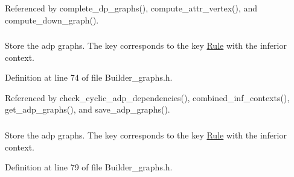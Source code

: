 Referenced by complete\_\-dp\_\-graphs(), compute\_\-attr\_\-vertex(), and compute\_\-down\_\-graph().

\hypertarget{classgenevalmag_1_1Builder__graphs_a75e37bb5a6f499fdd57f97061e313ec5}{
\subsubsection[{p\_\-Adp\_\-graphs}]{}}
\label{classgenevalmag_1_1Builder__graphs_a75e37bb5a6f499fdd57f97061e313ec5}


Store the adp graphs. The key corresponds to the key \hyperlink{classgenevalmag_1_1Rule}{Rule} with the inferior context. 



Definition at line 74 of file Builder\_\-graphs.h.



Referenced by check\_\-cyclic\_\-adp\_\-dependencies(), combined\_\-inf\_\-contexts(), get\_\-adp\_\-graphs(), and save\_\-adp\_\-graphs().

\hypertarget{classgenevalmag_1_1Builder__graphs_a54a45b424086582d4ed7bb99b948a956}{
\subsubsection[{p\_\-Adp\_\-subgraphs\_\-cyclics}]{}}
\label{classgenevalmag_1_1Builder__graphs_a54a45b424086582d4ed7bb99b948a956}


Store the adp graphs. The key corresponds to the key \hyperlink{classgenevalmag_1_1Rule}{Rule} with the inferior context. 



Definition at line 79 of file Builder\_\-graphs.h.




